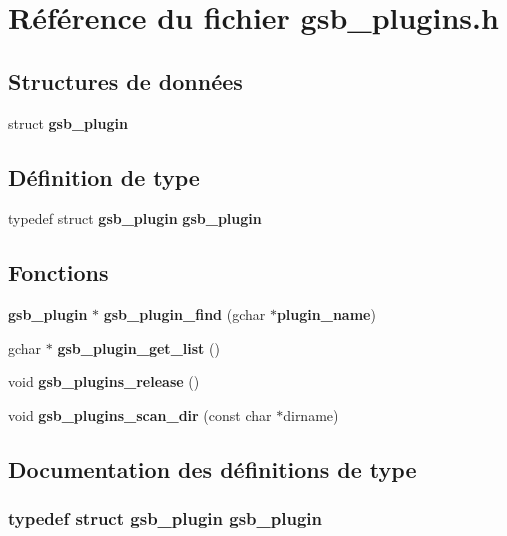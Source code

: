 \section{Référence du fichier gsb\_\-plugins.h}
\label{gsb__plugins_8h}
\subsection*{Structures de données}
\begin{DoxyCompactItemize}
\item 
struct {\bf gsb\_\-plugin}
\end{DoxyCompactItemize}
\subsection*{Définition de type}
\begin{DoxyCompactItemize}
\item 
typedef struct {\bf gsb\_\-plugin} {\bf gsb\_\-plugin}
\end{DoxyCompactItemize}
\subsection*{Fonctions}
\begin{DoxyCompactItemize}
\item 
{\bf gsb\_\-plugin} $\ast$ {\bf gsb\_\-plugin\_\-find} (gchar $\ast${\bf plugin\_\-name})
\item 
gchar $\ast$ {\bf gsb\_\-plugin\_\-get\_\-list} ()
\item 
void {\bf gsb\_\-plugins\_\-release} ()
\item 
void {\bf gsb\_\-plugins\_\-scan\_\-dir} (const char $\ast$dirname)
\end{DoxyCompactItemize}


\subsection{Documentation des définitions de type}
\subsubsection[{gsb\_\-plugin}]{\setlength{\rightskip}{0pt plus 5cm}typedef struct {\bf gsb\_\-plugin}   {\bf gsb\_\-plugin}}\label{gsb__plugins_8h_acac3ce23ba4ae5a7c532f84774c3a45e}


